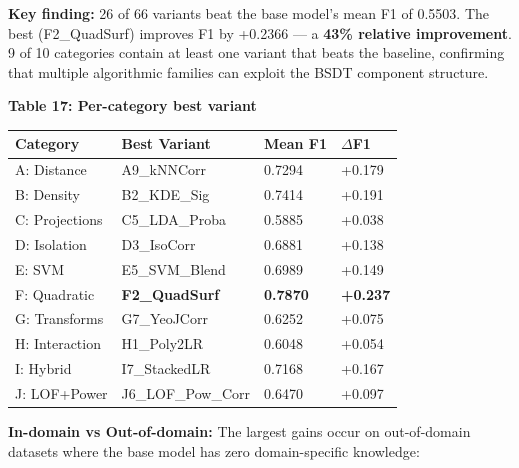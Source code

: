 \documentclass[
  11pt,
]{article}
\newcounter{none} %
\begin{document}
\textbf{Key finding:} 26 of 66 variants beat the base model’s mean F1 of
0.5503. The best (F2\_QuadSurf) improves F1 by +0.2366 — a \textbf{43\%
relative improvement}. 9 of 10 categories contain at least one variant
that beats the baseline, confirming that multiple algorithmic families
can exploit the BSDT component structure.

\textbf{Table 17: Per-category best variant}

{\def\LTcaptype{none} %
\begin{longtable}[]{@{}llll@{}}
\toprule\noalign{}
Category & Best Variant & Mean F1 & \(\Delta\)F1 \\
\midrule\noalign{}
\endhead
\bottomrule\noalign{}
\endlastfoot
A: Distance & A9\_kNNCorr & 0.7294 & +0.179 \\
B: Density & B2\_KDE\_Sig & 0.7414 & +0.191 \\
C: Projections & C5\_LDA\_Proba & 0.5885 & +0.038 \\
D: Isolation & D3\_IsoCorr & 0.6881 & +0.138 \\
E: SVM & E5\_SVM\_Blend & 0.6989 & +0.149 \\
F: Quadratic & \textbf{F2\_QuadSurf} & \textbf{0.7870} &
\textbf{+0.237} \\
G: Transforms & G7\_YeoJCorr & 0.6252 & +0.075 \\
H: Interaction & H1\_Poly2LR & 0.6048 & +0.054 \\
I: Hybrid & I7\_StackedLR & 0.7168 & +0.167 \\
J: LOF+Power & J6\_LOF\_Pow\_Corr & 0.6470 & +0.097 \\
\end{longtable}
}

\textbf{In-domain vs Out-of-domain:} The largest gains occur on
out-of-domain datasets where the base model has zero domain-specific
knowledge:
\end{document}
